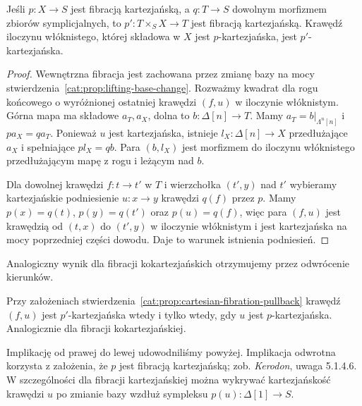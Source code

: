 \begin{stwierdzenie}\label{cat:prop:cartesian-fibration-pullback}
Jeśli $p:X\to S$ jest fibracją kartezjańską, a $q:T\to S$ dowolnym morfizmem zbiorów symplicjalnych, to $p':T\times_S X\to T$ jest fibracją kartezjańską. Krawędź iloczynu włóknistego, której składowa w $X$ jest $p$-kartezjańska, jest $p'$-kartezjańska.
\end{stwierdzenie}
\begin{proof}
Wewnętrzna fibracja jest zachowana przez zmianę bazy na mocy stwierdzenia~\ref{cat:prop:lifting-base-change}. Rozważmy kwadrat dla rogu końcowego o wyróżnionej ostatniej krawędzi $(f,u)$ w iloczynie włóknistym. Górna mapa ma składowe $a_T,a_X$, dolna to $b:\Delta[n]\to T$. Mamy $a_T=b|_{\Lambda^n[n]}$ i $p a_X=q a_T$. Ponieważ $u$ jest kartezjańska, istnieje $l_X:\Delta[n]\to X$ przedłużające $a_X$ i spełniające $pl_X=qb$. Para $(b,l_X)$ jest morfizmem do iloczynu włóknistego przedłużającym mapę z rogu i leżącym nad $b$.

Dla dowolnej krawędzi $f:t\to t'$ w $T$ i wierzchołka $(t',y)$ nad $t'$ wybieramy kartezjańskie podniesienie $u:x\to y$ krawędzi $q(f)$ przez $p$. Mamy $p(x)=q(t)$, $p(y)=q(t')$ oraz $p(u)=q(f)$, więc para $(f,u)$ jest krawędzią od $(t,x)$ do $(t',y)$ w iloczynie włóknistym i jest kartezjańska na mocy poprzedniej części dowodu. Daje to warunek istnienia podniesień.
\end{proof}
Analogiczny wynik dla fibracji kokartezjańskich otrzymujemy przez odwrócenie kierunków.

\begin{stwierdzenie}\label{cat:prop:cartesian-base-change-reflection}
Przy założeniach stwierdzenia~\ref{cat:prop:cartesian-fibration-pullback} krawędź $(f,u)$ jest $p'$-kartezjańska wtedy i tylko wtedy, gdy $u$ jest $p$-kartezjańska. Analogicznie dla fibracji kokartezjańskiej.
\end{stwierdzenie}
Implikację od prawej do lewej udowodniliśmy powyżej. Implikacja odwrotna korzysta z założenia, że $p$ jest fibracją kartezjańską; zob. \emph{Kerodon}, uwaga 5.1.4.6. W szczególności dla fibracji kartezjańskiej można wykrywać kartezjańskość krawędzi $u$ po zmianie bazy wzdłuż sympleksu $p(u):\Delta[1]\to S$.

